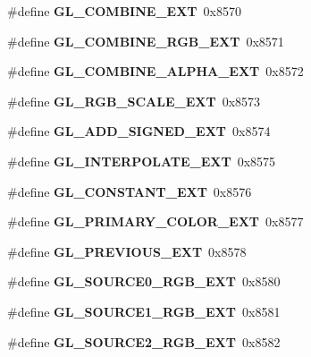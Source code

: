 \begin{DoxyCompactItemize}
\item 
\#define {\bfseries G\+L\+\_\+\+C\+O\+M\+B\+I\+N\+E\+\_\+\+E\+X\+T}~0x8570\label{_s_d_l__opengl_8h_a2e273069e7699f4ff1d1351497ff6a00}

\item 
\#define {\bfseries G\+L\+\_\+\+C\+O\+M\+B\+I\+N\+E\+\_\+\+R\+G\+B\+\_\+\+E\+X\+T}~0x8571\label{_s_d_l__opengl_8h_af159195a87191c457a6f6b3ba5a6aa11}

\item 
\#define {\bfseries G\+L\+\_\+\+C\+O\+M\+B\+I\+N\+E\+\_\+\+A\+L\+P\+H\+A\+\_\+\+E\+X\+T}~0x8572\label{_s_d_l__opengl_8h_a255c21d2b3063606504b0beec5c8e2d6}

\item 
\#define {\bfseries G\+L\+\_\+\+R\+G\+B\+\_\+\+S\+C\+A\+L\+E\+\_\+\+E\+X\+T}~0x8573\label{_s_d_l__opengl_8h_ab6c506cf91e2a11ebb34c86d51cfd804}

\item 
\#define {\bfseries G\+L\+\_\+\+A\+D\+D\+\_\+\+S\+I\+G\+N\+E\+D\+\_\+\+E\+X\+T}~0x8574\label{_s_d_l__opengl_8h_a99a413f92f5d7f48eac150313e9c14fd}

\item 
\#define {\bfseries G\+L\+\_\+\+I\+N\+T\+E\+R\+P\+O\+L\+A\+T\+E\+\_\+\+E\+X\+T}~0x8575\label{_s_d_l__opengl_8h_addafb06c9b38577b00ec7fc1847afa8a}

\item 
\#define {\bfseries G\+L\+\_\+\+C\+O\+N\+S\+T\+A\+N\+T\+\_\+\+E\+X\+T}~0x8576\label{_s_d_l__opengl_8h_a2237d910fdf7b66e9bd3167b9f90f516}

\item 
\#define {\bfseries G\+L\+\_\+\+P\+R\+I\+M\+A\+R\+Y\+\_\+\+C\+O\+L\+O\+R\+\_\+\+E\+X\+T}~0x8577\label{_s_d_l__opengl_8h_a6349861278824b305ef32f02980bb577}

\item 
\#define {\bfseries G\+L\+\_\+\+P\+R\+E\+V\+I\+O\+U\+S\+\_\+\+E\+X\+T}~0x8578\label{_s_d_l__opengl_8h_ade5ff6e748965ebce4f219069fcf02ed}

\item 
\#define {\bfseries G\+L\+\_\+\+S\+O\+U\+R\+C\+E0\+\_\+\+R\+G\+B\+\_\+\+E\+X\+T}~0x8580\label{_s_d_l__opengl_8h_a224182f913d011209adfbb753608ec65}

\item 
\#define {\bfseries G\+L\+\_\+\+S\+O\+U\+R\+C\+E1\+\_\+\+R\+G\+B\+\_\+\+E\+X\+T}~0x8581\label{_s_d_l__opengl_8h_a12c782c4048426e0604c10717a39b545}

\item 
\#define {\bfseries G\+L\+\_\+\+S\+O\+U\+R\+C\+E2\+\_\+\+R\+G\+B\+\_\+\+E\+X\+T}~0x8582\label{_s_d_l__opengl_8h_aae17331f4e7c3cb591633d89bef1de0d}


\end{DoxyCompactItemize}
